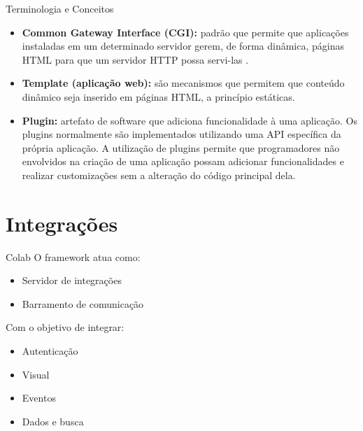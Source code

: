 \documentclass{beamer}
\begin{document}
\begin{frame}[allowframebreaks]{Terminologia e Conceitos}
\begin{itemize}
    \item{
        \textbf{Common Gateway Interface (CGI):} padrão que permite que aplicações instaladas em um determinado servidor gerem, de forma dinâmica, páginas HTML para que um servidor HTTP possa servi-las \cite{robinson2004rfc}.
    }
    
    \framebreak
    \item{
        \textbf{Template (aplicação web):} são mecanismos que permitem que conteúdo dinâmico seja inserido em páginas HTML, a princípio estáticas.
    }
    
    \item{
        \textbf{Plugin:} artefato de software que adiciona funcionalidade à uma aplicação. Os plugins normalmente são implementados utilizando uma API específica da própria aplicação. A utilização de plugins permite que programadores não envolvidos na criação de uma aplicação possam adicionar funcionalidades e realizar customizações sem a alteração do código principal dela.
    }
  \end{itemize}
\end{frame}

\section{Integrações}

\begin{frame}{Colab}
  O framework atua como:
  \begin{itemize}
      \item {
        Servidor de integrações
      }
      \item {
        Barramento de comunicação
      }
  \end{itemize}
  
  \hfill \break

  Com o objetivo de integrar:
  \begin{itemize}
      \item {
        Autenticação
      }
      \item {
        Visual
      }
      \item{
        Eventos
      }
      \item{
        Dados e busca
      }
  \end{itemize}
\end{frame}
\end{document}
